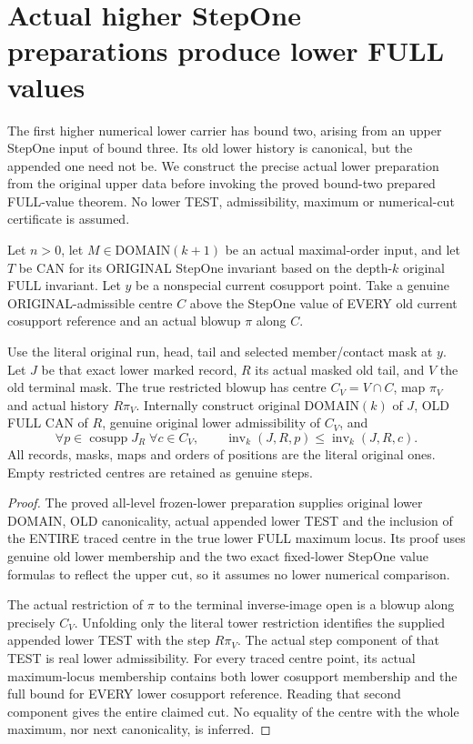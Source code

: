 \section{Actual higher StepOne preparations produce lower FULL values}

The first higher numerical lower carrier has bound two, arising from an
upper StepOne input of bound three. Its old lower history is canonical,
but the appended one need not be. We construct the precise actual lower
preparation from the original upper data before invoking the proved
bound-two prepared FULL-value theorem. No lower TEST, admissibility,
maximum or numerical-cut certificate is assumed.

\begin{theorem}
\label{hir:original-stepone-frozen-lower-actual-full-cut-step}
\leanok
Let $n>0$, let $M\in\mathrm{DOMAIN}(k+1)$ be an actual maximal-order
input, and let $T$ be CAN for its ORIGINAL StepOne invariant based on the
depth-$k$ original FULL invariant. Let $y$ be a nonspecial current
cosupport point. Take a genuine ORIGINAL-admissible centre $C$ above the
StepOne value of EVERY old current cosupport reference and an actual
blowup $\pi$ along $C$.

Use the literal original run, head, tail and selected member/contact
mask at $y$. Let $J$ be that exact lower marked record, $R$ its actual
masked old tail, and $V$ the old terminal mask. The true restricted
blowup has centre $C_V=V\cap C$, map $\pi_V$ and actual history
$R\pi_V$. Internally construct original DOMAIN$(k)$ of $J$, OLD FULL
CAN of $R$, genuine original lower admissibility of $C_V$, and
\[
 \forall p\in\operatorname{cosupp}J_R\;\forall c\in C_V,\qquad
 \operatorname{inv}_{k}(J,R,p)\le\operatorname{inv}_{k}(J,R,c).
\]
All records, masks, maps and orders of positions are the literal original
ones. Empty restricted centres are retained as genuine steps.
\end{theorem}
\begin{proof}
The proved all-level frozen-lower preparation supplies original lower
DOMAIN, OLD canonicality, actual appended lower TEST and the inclusion
of the ENTIRE traced centre in the true lower FULL maximum locus. Its
proof uses genuine old lower membership and the two exact fixed-lower
StepOne value formulas to reflect the upper cut, so it assumes no lower
numerical comparison.

The actual restriction of $\pi$ to the terminal inverse-image open is a
blowup along precisely $C_V$. Unfolding only the literal tower restriction
identifies the supplied appended lower TEST with the step $R\pi_V$.
The actual step component of that TEST is real lower admissibility.
For every traced centre point, its actual maximum-locus membership
contains both lower cosupport membership and the full bound for EVERY
lower cosupport reference. Reading that second component gives the
entire claimed cut. No equality of the centre with the whole maximum,
nor next canonicality, is inferred.
\end{proof}

